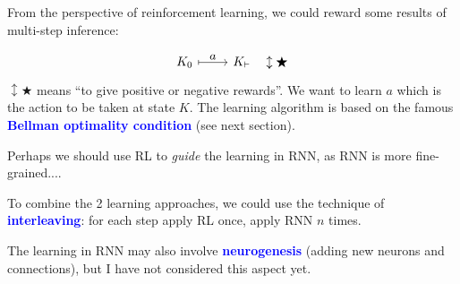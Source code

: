 \documentclass[orivec]{llncs}
\newcommand{\emp}[1]{\textbf{\textcolor{blue}{#1}}}
\begin{document}



From the perspective of reinforcement learning, we could reward some results of multi-step inference: \par
\begin{equation}
\begin{tikzcd}[row sep=tiny]
K_0 \arrow[r, mapsto, "\scalebox{1.3}{$a$}"] & K_\vdash \quad \updownarrow \bigstar
\end{tikzcd}
\end{equation}
$\updownarrow \bigstar$ means ``to give positive or negative rewards''.  We want to learn $a$ which is the action to be taken at state $K$.  The learning algorithm is based on the famous \emp{Bellman optimality condition} (see next section).

Perhaps we should use RL to \textit{guide} the learning in RNN, as RNN is more fine-grained....

To combine the 2 learning approaches, we could use the technique of \emp{interleaving}: for each step apply RL once, apply RNN $n$ times.


The learning in RNN may also involve \emp{neurogenesis} (adding new neurons and connections), but I have not considered this aspect yet.
\end{document}
